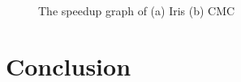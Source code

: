 \documentclass[review]{elsarticle}
\begin{document}
\begin{figure}
    \centering

    
     \caption{\small{The speedup graph of  (a) Iris (b) CMC}}
 \label{fig:Speedup}
\end{figure}
 

\section{Conclusion}\label{sec:con}
\end{document}
